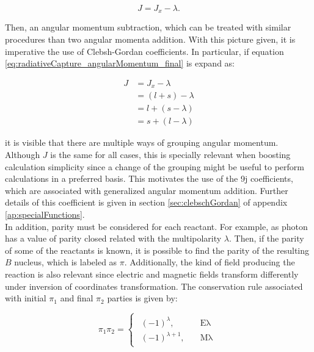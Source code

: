 \documentclass[openany]{book}
\begin{document}
\begin{equation}  \label{eq:radiativeCapture_angularMomentum_final}
	J = J_x - \lambda.
\end{equation}

Then, an angular momentum subtraction, which can be treated with similar procedures than two angular momenta addition.  With this picture given, it is imperative the use of Clebsh-Gordan coefficients. In particular, if equation \ref{eq:radiativeCapture_angularMomentum_final} is expand as: 

\begin{equation}  \label{eq:radiativeCapture_angularMomentum_expanded}
	\begin{split}
		J  &= J_x - \lambda \\
			&= (l + s) - \lambda \\
			&= l + (s - \lambda) \\
			&= s + (l - \lambda)
	\end{split}
\end{equation}

it is visible that there are multiple ways of grouping angular momentum. Although $J$ is the same for all cases,  this is specially relevant when boosting calculation simplicity since a change of the grouping might be useful to perform calculations in a preferred basis. This motivates the use of the 9j coefficients, which are associated with generalized angular momentum addition. Further details of this coefficient is given in section \ref{sec:clebschGordan} of appendix \ref{ap:specialFunctions}. \\

In addition, parity must be considered for each reactant. For example, as photon has a value of parity closed related with the multipolarity $\lambda$. Then, if the parity of some of the reactants is known, it is possible to find the parity of the resulting $B$ nucleus, which is labeled as $\pi$.  Additionally, the kind of field producing the reaction is also relevant since electric and magnetic fields transform differently under inversion of coordinates transformation. The conservation rule associated with initial $\pi_1$ and final $\pi_2$ parties is given by:  

\begin{equation} \label{eq:radiativeCapture_parity}
	\pi_1 \pi_2 = 	\left\{\begin{array}{l}
		\begin{split}
			(-1)^{\lambda}, \quad & \mathrm{E\lambda} \\ 
			(-1)^{\lambda + 1}, \quad & \mathrm{M\lambda}
		\end{split}
	\end{array}\right.
\end{equation}
\end{document}

